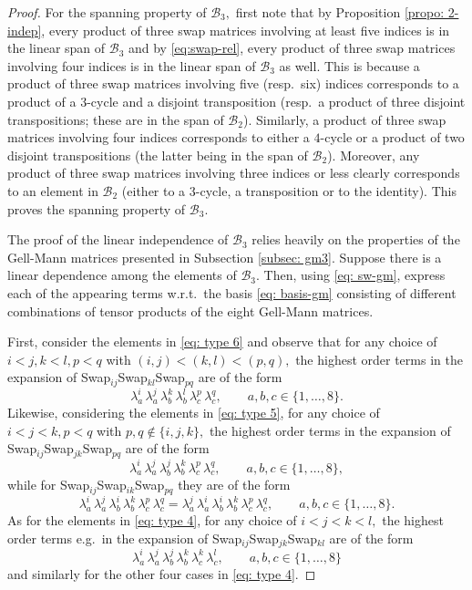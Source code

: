 \documentclass[12pt,dvipsnames,accepted=2016-08-18,a4paper,onecolumn]{quantumarticle}
\numberwithin{equation}{section}
\theoremstyle{definition}
\begin{document}
\begin{proof}
  For the spanning property of $\mathcal{B}_3,$ first note that by Proposition \ref{propo: 2-indep}, every product of three swap matrices involving at least five indices is in the linear span of $\mathcal{B}_3$ and by 
  \eqref{eq:swap-rel}, every product of three swap matrices involving four indices is in the linear span of $\mathcal{B}_3$ as well. This is because a product of three swap matrices involving five (resp.~six) indices corresponds to a product of a $3$-cycle and a disjoint transposition (resp.~a product of three disjoint transpositions; these are in the span of $\mathcal{B}_2$). Similarly,  a product of three swap matrices involving four indices corresponds to either a $4$-cycle or a product of two disjoint transpositions (the latter being in the span of $\mathcal{B}_2$). Moreover, any product of three swap matrices involving three indices or less clearly corresponds to an element in $\mathcal{B}_2$ (either to a $3$-cycle, a transposition or to the identity). This proves the spanning property of $\mathcal{B}_3.$

The proof of the linear independence of $\mathcal{B}_3$ relies heavily on the properties of the Gell-Mann matrices presented in Subsection \ref{subsec: gm3}. Suppose there is a linear dependence among the elements of $\mathcal{B}_3.$ 
Then, using \eqref{eq: sw-gm}, express each of the appearing terms w.r.t.~the basis \eqref{eq: basis-gm} consisting of different combinations of tensor products of the eight Gell-Mann matrices.


First, consider the elements in \eqref{eq: type 6} and observe that for any choice of $i < j, k < l, p < q$ with $(i,j) < (k,l) < (p,q),$ the highest order terms in the expansion of Swap$_{ij}$Swap$_{kl}$Swap$_{pq}$ are of the form
$$
\lambda_a^i\, \lambda_a^j\, \lambda_b^k\, \lambda_b^l\, \lambda_c^p\, \lambda_c^q, \quad \quad a,b,c \in \{1,\ldots,8\}.
$$
Likewise, considering the elements in \eqref{eq: type 5}, for any choice of $i < j < k,  p<q$ with $p,q \notin \{i,j,k\},$ the highest order terms in the expansion of Swap$_{ij}$Swap$_{jk}$Swap$_{pq}$ are of the form
$$
\lambda_a^i\, \lambda_a^j\, \lambda_b^j\, \lambda_b^k\, \lambda_c^p\, \lambda_c^q, 
\quad \quad a,b,c \in \{1,\ldots,8\},
$$
while for Swap$_{ij}$Swap$_{ik}$Swap$_{pq}$ they are of the form
$$
\lambda_a^i\, \lambda_a^j\, \lambda_b^i\, \lambda_b^k\, \lambda_c^p\, \lambda_c^q = \lambda_a^j\,\lambda_a^i\,  \lambda_b^i\, \lambda_b^k\, \lambda_c^p\, \lambda_c^q ,
\quad \quad a,b,c \in \{1,\ldots,8\}.
$$
As for the elements in \eqref{eq: type 4}, for any choice of $i < j < k < l,$ the highest order terms e.g.~in the expansion of Swap$_{ij}$Swap$_{jk}$Swap$_{kl}$ are of the form
$$
\lambda_a^i\, \lambda_a^j\, \lambda_b^j\, \lambda_b^k\, \lambda_c^k\, \lambda_c^l, 
\quad \quad a,b,c \in \{1,\ldots,8\}
$$
and similarly for the other four cases in \eqref{eq: type 4}.


\end{proof}
\end{document}
